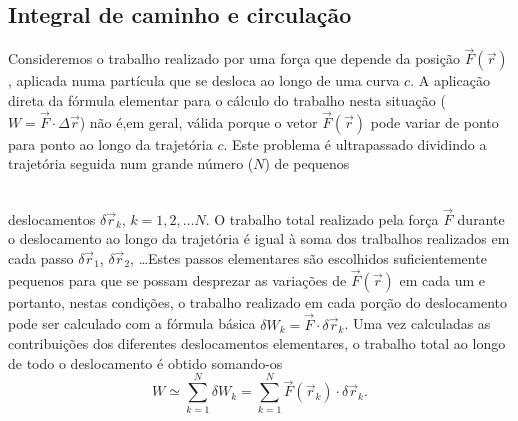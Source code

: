 \subsection{Integral de caminho e circulação}
\begin{minipage}[t]{0.7\textwidth}
Consideremos o trabalho realizado por uma força que depende da posição $\vec
F(\vec r)$, aplicada numa partícula que se desloca ao longo de uma curva $c$. A
aplicação direta da fórmula elementar para o cálculo do trabalho nesta situação
($W=\vec F\cdot\Delta\vec r$) não é,em geral, válida porque o vetor $\vec F(\vec
r)$ pode variar de ponto para ponto ao longo da trajetória $c$.  Este problema é
ultrapassado dividindo a trajetória seguida num grande número ($N$) de pequenos 
\linebreak
\vspace{-0.65\baselineskip}
\end{minipage}\hfill
{}\\
deslocamentos $\delta\vec r_k$, $k=1,2,\ldots N$. O
trabalho total realizado pela força $\vec F$ durante o deslocamento ao longo da
trajetória é igual à soma dos tralbalhos realizados em cada passo $\delta\vec
r_1$, $\delta \vec r_2$, \ldots Estes passos elementares são escolhidos
suficientemente pequenos para que se possam desprezar as variações de $\vec
F(\vec r)$ em cada um e portanto, nestas condições, o trabalho realizado em
cada porção do deslocamento pode ser calculado com a fórmula básica $\delta
W_k=\vec F\cdot\delta\vec r_k$.  Uma vez calculadas as contribuições dos
diferentes deslocamentos elementares, o trabalho total ao longo de todo o
deslocamento é obtido somando-os
\begin{equation*}
W\simeq \sum_{k=1}^N \delta W_k=
        \sum_{k=1}^N \vec F(\vec r_k)\cdot \delta \vec r_k.
\end{equation*}
